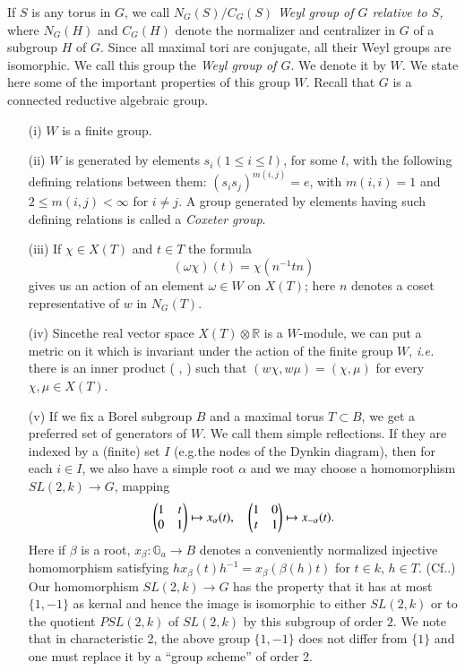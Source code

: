 If $S$ is any torus in $G$, we call $N_{G}(S)/C_{G}(S)$ {\em Weyl
  group of $G$ relative to $S$,} where $N_{G}(H)$
and $C_{G}(H)$ 
denote the normalizer and centralizer in $G$ of a subgroup $H$ of
$G$. Since all maximal tori are conjugate, all their Weyl groups are
isomorphic. We call this group the {\em Weyl group
  of $G$}. We denote 
it by $W$. We state here some of the important properties of this
group $W$. Recall that $G$ is a connected reductive algebraic group.
\begin{itemize}
\item[(i)] $W$ is a finite group.

\item[(ii)] $W$ is generated by elements $s_{i}(1\leq i\leq l)$, for
  some $l$, with the following defining relations between them:
  $(s_{i}s_{j})^{m(i,j)}=e$, with $m(i,i)=1$ and $2\leq m(i,j)<\infty$
  for $i\neq j$. A group generated by elements having such defining
  relations is called a {\em Coxeter group}. 

\item[(iii)] If $\chi\in X(T)$ and $t\in T$ the formula
$$
(\omega \chi)(t)=\chi(n^{-1}tn)
$$
gives us an action of an element $\omega\in W$ on $X(T)$; here $n$
denotes a coset representative of $w$ in $N_{G}(T)$.

\item[(iv)] Since\pageoriginale the real vector space $X(T)\otimes
  \mathbb{R}$ is a $W$-module, we can put a metric on it which is
  invariant under the action of the finite group $W$, {\em i.e.} there
  is an inner product ( , )\label{page4} such that $(w\chi,w\mu)=(\chi,\mu)$ for
  every $\chi,\mu\in X(T)$.

\item[(v)] If we fix a Borel subgroup $B$ and a maximal torus
  $T\subset B$, we get a preferred set of generators of $W$. We call
  them simple reflections. If they are indexed by a (finite) set $I$
  (e.g.\@ the nodes of the Dynkin diagram), then for each $i\in I$, we
  also have a simple root $\alpha$ and we may choose a homomorphism
  $SL(2,k)\to G$, mapping
$$
\begin{pmatrix}
1 & t\\
0 & 1
\end{pmatrix}
\mapsto x_{\alpha}(t),\quad 
\begin{pmatrix}
1 & 0\\
t & 1
\end{pmatrix}
\mapsto x_{-\alpha}(t).
$$
Here if $\beta$ is a root, $x_{\beta}:\mathbb{G}_{a}\to B$ denotes a
conveniently normalized injective homomorphism satisfying
$hx_{\beta}(t)h^{-1}=x_{\beta}(\beta(h)t)$ for $t\in k$, $h\in
T$. (Cf.\@ \cite[Chapters 9, 10]{key34}.) Our homomorphism $SL(2,k)\to
G$ has the property that it has at most $\{1,-1\}$ as kernal and hence
the image is isomorphic to either $SL(2,k)$ or to the quotient
$PSL(2,k)$ of $SL(2,k)$ by this subgroup of order $2$. We note that in
characteristic 2, the above group $\{1,-1\}$ does not differ from
$\{1\}$ and one must replace it by a ``group scheme'' of order 2.
\end{itemize}

